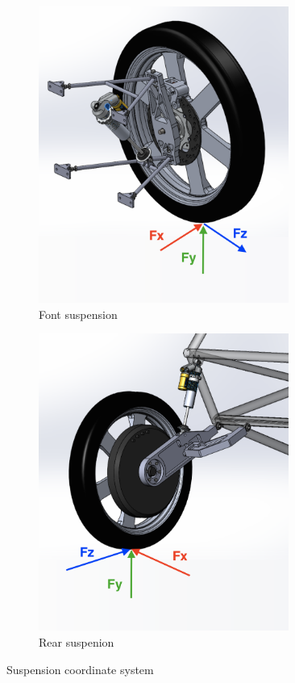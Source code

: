 \documentclass[10pt]{article}
\begin{document}
\begin{figure}
\centering
\begin{subfigure}[b]{.48\textwidth}
\centering
\includegraphics[width=0.9\textwidth]{figures/front-axis-directions}
\caption{Font suspension}
\end{subfigure}
\begin{subfigure}[b]{.48\textwidth}
\centering
\includegraphics[width=0.9\textwidth]{figures/rear-axis-directions}
\caption{Rear suspenion}
\end{subfigure}
\caption{Suspension coordinate system}
\label{fig:suspension-coordinate-system}
\end{figure}
\end{document}
